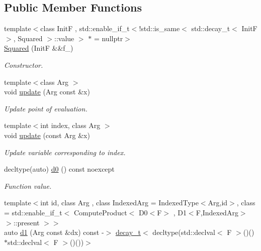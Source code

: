 \subsection*{Public Member Functions}
\begin{DoxyCompactItemize}
\item 
{\footnotesize template$<$class Init\-F , std\-::enable\-\_\-if\-\_\-t$<$!std\-::is\-\_\-same$<$ std\-::decay\-\_\-t$<$ Init\-F $>$, Squared $>$\-::value $>$ $\ast$  = nullptr$>$ }\\\hyperlink{structFunG_1_1MathematicalOperations_1_1Squared_af786c2153ef17b5d0ddf8e0b51d060d6}{Squared} (Init\-F \&\&f\-\_\-)
\begin{DoxyCompactList}\small\item\em Constructor. \end{DoxyCompactList}\item 
{\footnotesize template$<$class Arg $>$ }\\void \hyperlink{structFunG_1_1MathematicalOperations_1_1Squared_abea95d90dc29ac105c43f4eadde84cab}{update} (Arg const \&x)
\begin{DoxyCompactList}\small\item\em Update point of evaluation. \end{DoxyCompactList}\item 
{\footnotesize template$<$int index, class Arg $>$ }\\void \hyperlink{structFunG_1_1MathematicalOperations_1_1Squared_a1d890825175df9b79fd73bf8248496ad}{update} (const Arg \&x)
\begin{DoxyCompactList}\small\item\em Update variable corresponding to index. \end{DoxyCompactList}\item 
decltype(auto) \hyperlink{structFunG_1_1MathematicalOperations_1_1Squared_a57252496703fd8fb6af59beb31b597d7}{d0} () const noexcept
\begin{DoxyCompactList}\small\item\em Function value. \end{DoxyCompactList}\item 
{\footnotesize template$<$int id, class Arg , class Indexed\-Arg  = Indexed\-Type$<$\-Arg,id$>$, class  = std\-::enable\-\_\-if\-\_\-t$<$ Compute\-Product$<$ D0$<$\-F$>$ , D1$<$\-F,\-Indexed\-Arg$>$ $>$\-::present $>$$>$ }\\auto \hyperlink{structFunG_1_1MathematicalOperations_1_1Squared_ab8f7f12fe6001c5650d9c8e18e622769}{d1} (Arg const \&dx) const -\/$>$ \hyperlink{namespaceFunG_a195ac37d8696970c89b112c81a1e4d6e}{decay\-\_\-t}$<$ decltype(std\-::declval$<$ F $>$()()$\ast$std\-::declval$<$ F $>$()())$>$

\end{DoxyCompactItemize}
